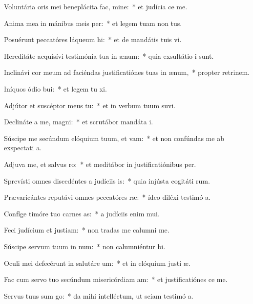 \item Voluntária oris mei beneplácita fac, mine:~* et judícia  ce me.
\item Anima mea in mánibus meis per:~* et legem tuam non  tus.
\item Posuérunt peccatóres láqueum hi:~* et de mandátis tuis  vi.
\item Hereditáte acquisívi testimónia tua in ænum:~* quia exsultátio  i sunt.
\item Inclinávi cor meum ad faciéndas justificatiónes tuas in ænum,~* propter retrinem.
\item Iníquos ódio bui:~* et legem tu xi.
\item Adjútor et suscéptor meus  tu:~* et in verbum tuum suvi.
\item Declináte a me, magni:~* et scrutábor mandáta  i.
\item Súscipe me secúndum elóquium tuum, et vam:~* et non confúndas me ab exspectati a.
\item Adjuva me, et salvus ro:~* et meditábor in justificatiónibus  per.
\item Sprevísti omnes discedéntes a judíciis is:~* quia injústa cogitáti rum.
\item Prævaricántes reputávi omnes peccatóres ræ:~* ídeo diléxi testimó a.
\item Confíge timóre tuo carnes as:~* a judíciis enim  mui.
\item Feci judícium et justiam:~* non tradas me calumni me.
\item Súscipe servum tuum in num:~* non calumniéntur  bi.
\item Oculi mei defecérunt in salutáre um:~* et in elóquium justí æ.
\item Fac cum servo tuo secúndum misericórdiam am:~* et justificatiónes  ce me.
\item Servus tuus sum go:~* da mihi intelléctum, ut sciam testimó a.
